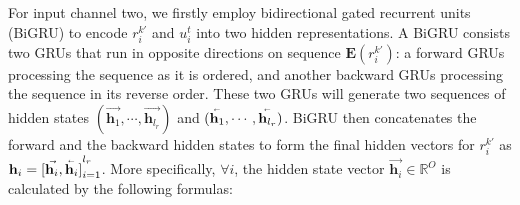 For input channel two, we firstly employ bidirectional gated recurrent units (BiGRU) \cite{DBLP:journals/corr/ChungGCB14} to encode $r_i^{k'}$ and $u_i^t$ into two hidden representations. A BiGRU consists two GRUs that run in opposite directions on sequence $\mathbf{E}(r_i^{k'})$: a forward GRUs processing the sequence as it is ordered, and another backward GRUs processing the sequence in its reverse order. These two GRUs will generate two sequences of hidden states $(\vec{\mathbf{h}_1}, \cdots, \vec{\mathbf{h}_{l_r}})$ and $(\overset{{}_{\shortleftarrow}}{\mathbf{h}_1}, \cdots, \overset{{}_{\shortleftarrow}}{\mathbf{h}_{l_r}}  )$. BiGRU then concatenates the forward and the backward hidden states to form the final hidden vectors for $r_i^{k'}$ as $\mathbf{h}_i = {[\vec{\mathbf{h}_i}, \overset{{}_{\shortleftarrow}}{\mathbf{h}_i} ]}_{i=1}^{l_r}$. More specifically, $\forall i$, the hidden state vector $\vec{\mathbf{h}_i}\in \mathbb{R}^O$ is calculated by the following formulas:

